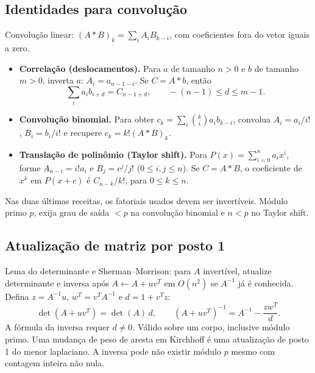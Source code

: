 \subsection{Identidades para convolução}
Convolução linear: $(A*B)_k=\sum_i A_iB_{k-i}$, com coeficientes fora do vetor iguais a zero.
\begin{itemize}[leftmargin=*,label={}]
\item \textbf{Correlação (deslocamentos).}
Para $a$ de tamanho $n>0$ e $b$ de tamanho $m>0$, inverta $a$: $A_i=a_{n-1-i}$. Se $C=A*b$, então
\[
\sum_i a_i b_{i+d}=C_{n-1+d},\qquad -(n-1)\le d\le m-1.
\]

\item \textbf{Convolução binomial.}
Para obter $c_k=\sum_i\binom{k}{i}a_i b_{k-i}$, convolua $A_i=a_i/i!$, $B_i=b_i/i!$ e recupere $c_k=k!(A*B)_k$.

\item \textbf{Translação de polinômio (Taylor shift).}
Para $P(x)=\sum_{i=0}^{n}a_i x^i$, forme $A_{n-i}=i!a_i$ e $B_j=c^j/j!$ ($0\le i,j\le n$). Se $C=A*B$, o coeficiente de $x^k$ em $P(x+c)$ é $C_{n-k}/k!$, para $0\le k\le n$.
\end{itemize}
Nas duas últimas receitas, os fatoriais usados devem ser invertíveis. Módulo primo $p$, exija grau de saída $<p$ na convolução binomial e $n<p$ no Taylor shift.


\subsection{Atualização de matriz por posto 1}
Lema do determinante e Sherman--Morrison: para $A$ invertível, atualize determinante e inversa após $A\gets A+uv^T$ em $O(n^2)$ se $A^{-1}$ já é conhecida. Defina $z=A^{-1}u$, $w^T=v^TA^{-1}$ e $d=1+v^Tz$:
\[
\det(A+uv^T)=\det(A)\,d,\qquad
(A+uv^T)^{-1}=A^{-1}-\frac{zw^T}{d}.
\]
A fórmula da inversa requer $d\ne0$. Válido sobre um corpo, inclusive módulo primo.
\ifextended
Uma mudança de peso de aresta em Kirchhoff é uma atualização de posto 1 do menor laplaciano. A inversa pode não existir módulo $p$ mesmo com contagem inteira não nula.
\fi

